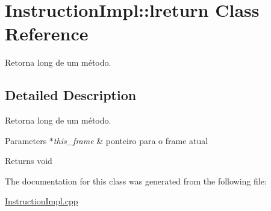 \hypertarget{class_instruction_impl_1_1lreturn}{}\section{Instruction\+Impl\+:\+:lreturn Class Reference}
\label{class_instruction_impl_1_1lreturn}


Retorna long de um método.  




\subsection{Detailed Description}
Retorna long de um método. 


\begin{DoxyParams}{Parameters}
{\em $\ast$this\+\_\+frame} & ponteiro para o frame atual \\
\hline
\end{DoxyParams}
\begin{DoxyReturn}{Returns}
void 
\end{DoxyReturn}


The documentation for this class was generated from the following file\+:\begin{DoxyCompactItemize}
\item 
\hyperlink{_instruction_impl_8cpp}{Instruction\+Impl.\+cpp}\end{DoxyCompactItemize}

